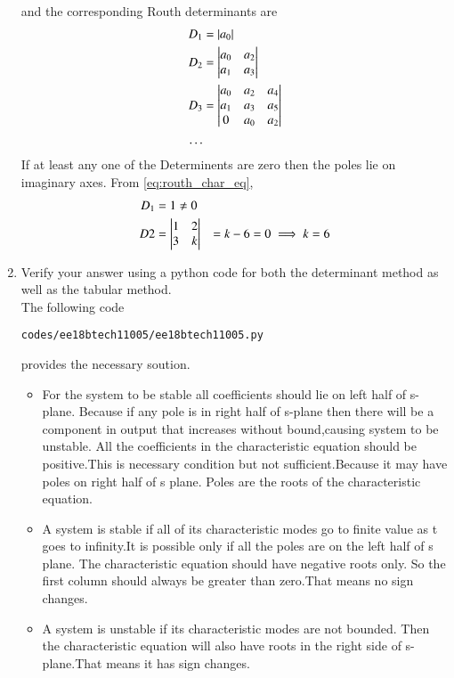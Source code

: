 \begin{enumerate}[label=\thesubsection.\arabic*.,ref=\thesubsection.\theenumi]
\begin{align}
\end{align}
and the corresponding Routh determinants are
\begin{align}
D_1 &= |a_0|
\\
D_2 &= 
\begin{vmatrix}
a_0 & a_2 
\\ 
a_1 & a_3
\end{vmatrix} 
\\
D_3 &=\begin{vmatrix}
a_0 & a_2 & a_4 
\\ a_1 & a_3 & a_5 
\\ 0 & a_0 & a_2\end{vmatrix}
\\
\dots
\end{align}
If at least any one of the Determinents are zero then the poles lie on imaginary axes.  From \eqref{eq:routh_char_eq},
%
\begin{align}
D_1 &= 1 \ne 0
\\
D2 &= \begin{vmatrix}
1 & 2 \\ 3 & k \end{vmatrix} 
&= k-6 =0 \implies k = 6
\end{align}
%
\item Verify your answer using a python code for both the determinant method as well as the tabular method.
\label{prob:ee18btech11005_python}
\\
\solution 
The following code 
%
\begin{lstlisting}
codes/ee18btech11005/ee18btech11005.py
\end{lstlisting}
%
provides the necessary soution.
\begin{itemize}
\item  For the system to be stable all coefficients should lie on left half of s-plane. Because if any pole is in right half of s-plane then there will be a component in output that increases without bound,causing system to be unstable.
All the coefficients in the characteristic equation should be positive.This is necessary condition but not sufficient.Because it may have poles on right half of s plane.
Poles are the roots of the characteristic equation.
    \item A system is stable if all of its characteristic modes go to finite value as t goes to infinity.It is possible only if all the poles are on the left half of s plane.
    The characteristic equation should have negative roots only. So the first column should always be greater than zero.That means no sign changes.
    \item A system is unstable if its characteristic modes are not bounded. Then the characteristic equation will also have roots in the right side of s-plane.That means it has sign changes.
    \end{itemize}

\end{enumerate}


